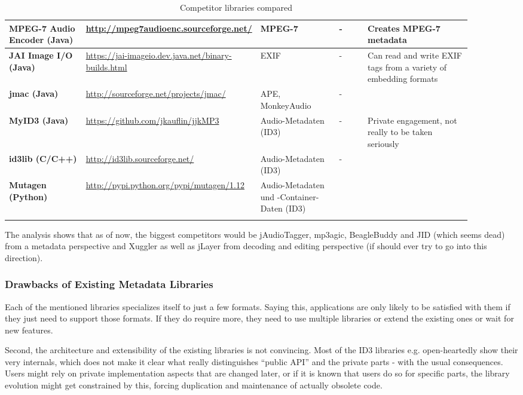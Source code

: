 \begin{landscape}
\begin{longtable}{|p{0.18\linewidth}|p{0.22\linewidth}|p{0.18\linewidth}|p{0.07\linewidth}|p{0.25\linewidth}|}
	\hline
\textbf{MPEG-7 Audio Encoder (Java)} & \url{http://mpeg7audioenc.sourceforge.net/} & MPEG-7 & - & Creates MPEG-7 metadata \\
	\hline
\textbf{JAI Image I/O (Java)} & \url{https://jai-imageio.dev.java.net/binary-builds.html} & EXIF & - & Can read and write EXIF tags from a variety of embedding formats \\
	\hline
\textbf{jmac (Java)} & \url{http://sourceforge.net/projects/jmac/} & APE, MonkeyAudio & - & \\
	\hline
 \textbf{MyID3 (Java)} & \url{https://github.com/jkauflin/jjkMP3} & Audio-Metadaten (ID3) & - & Private engagement, not really to be taken seriously \\
	\hline
\textbf{id3lib (C/C++)} & \url{http://id3lib.sourceforge.net/} & Audio-Metadaten (ID3) & - & \\
	\hline
\textbf{Mutagen (Python)} & \url{http://pypi.python.org/pypi/mutagen/1.12} & Audio-Metadaten und -Container-Daten (ID3) & & \\
	\hline
\caption{Competitor libraries compared}
\label{tab:Compet}
\end{longtable}
\end{landscape}

The analysis shows that as of now, the biggest competitors would be jAudioTagger, mp3agic, BeagleBuddy and JID (which seems dead) from a metadata perspective and Xuggler as well as jLayer from decoding and editing perspective (if \LibName{} should ever try to go into this direction).


\subsubsection{Drawbacks of Existing Metadata Libraries}
\label{sec:DrawbacksofExistingMetadataLibraries}

Each of the mentioned libraries specializes itself to just a few formats. Saying this, applications are only likely to be satisfied with them if they just need to support those formats. If they do require more, they need to use multiple libraries or extend the existing ones or wait for new features.

Second, the architecture and extensibility of the existing libraries is not convincing. Most of the ID3 libraries e.g. open-heartedly show their very internals, which does not make it clear what really distinguishes ``public API'' and the private parts - with the usual consequences. Users might rely on private implementation aspects that are changed later, or if it is known that users do so for specific parts, the library evolution might get constrained by this, forcing duplication and maintenance of actually obsolete code.

